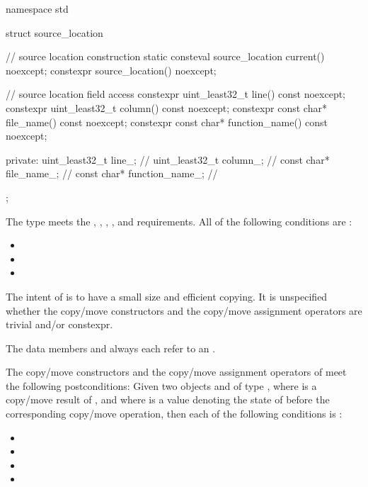 %
\begin{codeblock}
namespace std {
  struct source_location {
    // source location construction
    static consteval source_location current() noexcept;
    constexpr source_location() noexcept;

    // source location field access
    constexpr uint_least32_t line() const noexcept;
    constexpr uint_least32_t column() const noexcept;
    constexpr const char* file_name() const noexcept;
    constexpr const char* function_name() const noexcept;

  private:
    uint_least32_t line_;               // \expos
    uint_least32_t column_;             // \expos
    const char* file_name_;             // \expos
    const char* function_name_;         // \expos
  };
}
\end{codeblock}

\pnum
The type  meets the
,
,
,
, and
requirements.
All of the following conditions are :
\begin{itemize}
\item {}
\item {}
\item {}
\end{itemize}
\begin{note}
The intent of  is
to have a small size and efficient copying.
It is unspecified
whether the copy/move constructors and the copy/move assignment operators
are trivial and/or constexpr.
\end{note}

\pnum
The data members  and 
always each refer to an \ntbs{}.

\pnum
The copy/move constructors and the copy/move assignment operators of
 meet the following postconditions:
Given two objects   and  of type ,
where  is a copy/move result of , and
where  is a value denoting the state of 
before the corresponding copy/move operation,
then each of the following conditions is :
\begin{itemize}
\item {}
\item {}
\item {}
\item {}
\end{itemize}

